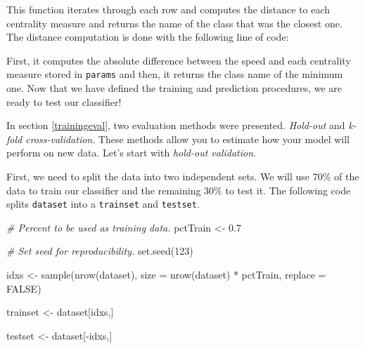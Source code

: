 \documentclass[
  11pt,
]{krantz}
\newenvironment{Shaded}{\begin{snugshade}}{\end{snugshade}}
\newcommand{\AttributeTok}[1]{\textcolor[rgb]{0.61,0.61,0.61}{#1}}
\newcommand{\CommentTok}[1]{\textcolor[rgb]{0.37,0.37,0.37}{\textit{#1}}}
\newcommand{\ConstantTok}[1]{\textcolor[rgb]{0,0,0}{#1}}
\newcommand{\DecValTok}[1]{\textcolor[rgb]{0.06,0.06,0.06}{#1}}
\newcommand{\FloatTok}[1]{\textcolor[rgb]{0.06,0.06,0.06}{#1}}
\newcommand{\FunctionTok}[1]{\textcolor[rgb]{0,0,0}{#1}}
\newcommand{\NormalTok}[1]{#1}
\newcommand{\OtherTok}[1]{\textcolor[rgb]{0.37,0.37,0.37}{#1}}
\newcommand{\SpecialCharTok}[1]{\textcolor[rgb]{0,0,0}{#1}}
\begin{document}
This function iterates through each row and computes the distance to each centrality measure and returns the name of the class that was the closest one. The distance computation is done with the following line of code:

\begin{Shaded}
\end{Shaded}

First, it computes the absolute difference between the speed and each centrality measure stored in \texttt{params} and then, it returns the class name of the minimum one. Now that we have defined the training and prediction procedures, we are ready to test our classifier!

In section \ref{trainingeval}, two evaluation methods were presented. \emph{Hold-out} and \emph{k-fold cross-validation}. These methods allow you to estimate how your model will perform on new data. Let's start with \emph{hold-out validation}.

First, we need to split the data into two independent sets. We will use \(70\%\) of the data to train our classifier and the remaining \(30\%\) to test it. The following code splits \texttt{dataset} into a \texttt{trainset} and \texttt{testset}.

\begin{Shaded}
\begin{Highlighting}[]
\CommentTok{\# Percent to be used as training data.}
\NormalTok{pctTrain }\OtherTok{\textless{}{-}} \FloatTok{0.7}

\CommentTok{\# Set seed for reproducibility.}
\FunctionTok{set.seed}\NormalTok{(}\DecValTok{123}\NormalTok{)}

\NormalTok{idxs }\OtherTok{\textless{}{-}} \FunctionTok{sample}\NormalTok{(}\FunctionTok{nrow}\NormalTok{(dataset),}
               \AttributeTok{size =} \FunctionTok{nrow}\NormalTok{(dataset) }\SpecialCharTok{*}\NormalTok{ pctTrain,}
               \AttributeTok{replace =} \ConstantTok{FALSE}\NormalTok{)}

\NormalTok{trainset }\OtherTok{\textless{}{-}}\NormalTok{ dataset[idxs,]}

\NormalTok{testset }\OtherTok{\textless{}{-}}\NormalTok{ dataset[}\SpecialCharTok{{-}}\NormalTok{idxs,]}
\end{Highlighting}
\end{Shaded}
\end{document}
